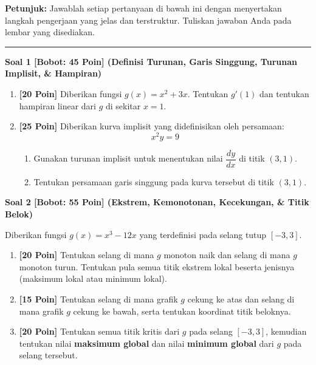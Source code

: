 \documentclass[11pt,a4paper]{article}
\begin{document}
\vspace{10pt}
\noindent\textbf{Petunjuk:} Jawablah setiap pertanyaan di bawah ini dengan menyertakan langkah pengerjaan yang jelas dan terstruktur. Tuliskan jawaban Anda pada lembar yang disediakan.

\vspace{8pt}
\hrule
\vspace{10pt}

\noindent\textbf{Soal 1 [Bobot: 45 Poin] (Definisi Turunan, Garis Singgung, Turunan Implisit, \& Hampiran)}
\begin{enumerate}[label=(\alph*), leftmargin=24pt]
    \item \textbf{[20 Poin]} Diberikan fungsi $g(x) = x^2 + 3x$. Tentukan $g'(1)$ dan tentukan hampiran linear dari $g$ di sekitar $x=1$.
    
    \item \textbf{[25 Poin]} Diberikan kurva implisit yang didefinisikan oleh persamaan:
    \[
    x^2y = 9
    \]
    \begin{enumerate}[label=(\roman*)]
        \item Gunakan turunan implisit untuk menentukan nilai $\dfrac{dy}{dx}$ di titik $(3, 1)$.
        \item Tentukan persamaan garis singgung pada kurva tersebut di titik $(3, 1)$.

    \end{enumerate}
\end{enumerate}

\vspace{14pt}

\noindent\textbf{Soal 2 [Bobot: 55 Poin] (Ekstrem, Kemonotonan, Kecekungan, \& Titik Belok)}
\vspace{4pt}

\noindent Diberikan fungsi $g(x) = x^3 - 12x$ yang terdefinisi pada selang tutup $[-3, 3]$.
\begin{enumerate}[label=(\alph*), leftmargin=24pt]
    \item \textbf{[20 Poin]} Tentukan selang di mana $g$ monoton naik dan selang di mana $g$ monoton turun. Tentukan pula semua titik ekstrem lokal beserta jenisnya (maksimum lokal atau minimum lokal).
    \item \textbf{[15 Poin]} Tentukan selang di mana grafik $g$ cekung ke atas dan selang di mana grafik $g$ cekung ke bawah, serta tentukan koordinat titik beloknya.
    \item \textbf{[20 Poin]} Tentukan semua titik kritis dari $g$ pada selang $[-3, 3]$, kemudian tentukan nilai \textbf{maksimum global} dan nilai \textbf{minimum global} dari $g$ pada selang tersebut.
\end{enumerate}
\end{document}
